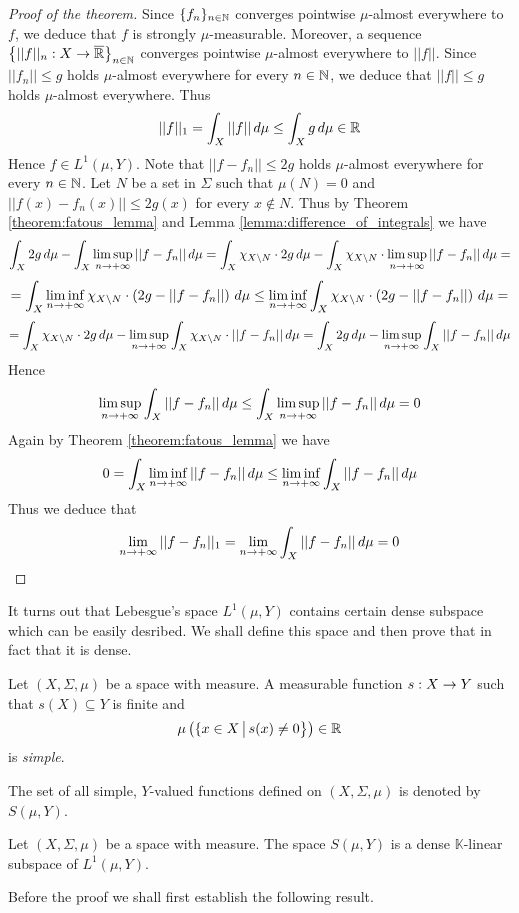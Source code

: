 \begin{proof}[Proof of the theorem]
Since $\{f_n\}_{n\in {\mathbb N}}$ converges pointwise $\mu$-almost everywhere to $f$, we deduce that $f$ is strongly $\mu$-measurable. Moreover, a sequence $\big\{||f||_n:X\rightarrow \overline{{\mathbb R}}\big\}_{n\in {\mathbb N}}$ converges pointwise $\mu$-almost everywhere to $||f||$. Since $||f_n||\leq g$ holds $\mu$-almost everywhere for every $n\in {\mathbb N}$, we deduce that $||f||\leq g$ holds $\mu$-almost everywhere. Thus
$$||f||_1 = \int_X||f||\,d\mu \leq \int_Xg\,d\mu \in {\mathbb R}$$
Hence $f\in L^1(\mu, Y)$. Note that $||f - f_n|| \leq 2g$ holds $\mu$-almost everywhere for every $n\in {\mathbb N}$. Let $N$ be a set in $\Sigma$ such that $\mu(N) = 0$ and $||f(x) - f_n(x)|| \leq 2g(x)$ for every $x \not \in N$. Thus by Theorem \ref{theorem:fatous_lemma} and Lemma \ref{lemma:difference_of_integrals} we have
$$\int_X2g\,d\mu - \int_X\limsup_{n\rightarrow +\infty}||f-f_n||\,d\mu  = \int_X\chi_{X\setminus N}\cdot 2g\,d\mu - \int_X\chi_{X\setminus N}\cdot \limsup_{n\rightarrow +\infty}||f-f_n||\,d\mu = $$
$$= \int_X\liminf_{n\rightarrow +\infty}\chi_{X\setminus N}\cdot  \left(2g - ||f-f_n||\right)\,d\mu \leq \liminf_{n\rightarrow +\infty}\int_X\chi_{X\setminus N}\cdot \left(2g - ||f- f_n||\right)\,d\mu =$$
$$= \int_X\chi_{X\setminus N}\cdot 2g\,d\mu - \limsup_{n\rightarrow +\infty}\int_X\chi_{X\setminus N}\cdot||f-f_n||\,d\mu = \int_X2g\,d\mu - \limsup_{n\rightarrow +\infty}\int_X||f-f_n||\,d\mu$$
Hence
$$\limsup_{n\rightarrow +\infty}\int_X||f - f_n||\,d\mu \leq \int_X\limsup_{n\rightarrow +\infty}||f - f_n||\,d\mu = 0$$
Again by Theorem \ref{theorem:fatous_lemma} we have
$$0 = \int_X\liminf_{n\rightarrow +\infty}||f-f_n||\,d\mu \leq \liminf_{n\rightarrow +\infty} \int_X||f - f_n||\,d\mu$$
Thus we deduce that
$$\lim_{n\rightarrow +\infty}||f - f_n||_1 = \lim_{n\rightarrow +\infty}\int_X||f - f_n||\,d\mu = 0$$
\end{proof}
\noindent
It turns out that Lebesgue's space $L^1(\mu, Y)$ contains certain dense subspace which can be easily desribed. We shall define this space and then prove that in fact that it is dense.

\begin{definition}
Let $(X,\Sigma, \mu)$ be a space with measure. A measurable function $s:X\rightarrow Y$ such that $s(X)\subseteq Y$ is finite and
$$\mu\left(\{x\in X\,\big|\,s(x)\neq 0\big\}\right) \in {\mathbb R}$$
is \textit{simple}.
\end{definition}
\noindent
The set of all simple, $Y$-valued functions defined on $(X,\Sigma, \mu)$ is denoted by $S(\mu, Y)$.

\begin{theorem}\label{theorem:simple_are_dense}
Let $(X,\Sigma, \mu)$ be a space with measure. The space $S(\mu, Y)$ is a dense $\mathbb{K}$-linear subspace of $L^1(\mu, Y)$.
\end{theorem}
\noindent
Before the proof we shall first establish the following result.

